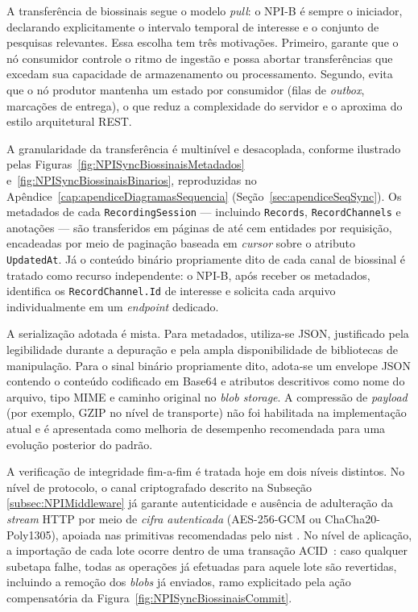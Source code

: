 A transferência de biossinais segue o modelo \textit{pull}: o NPI-B é sempre o iniciador, declarando explicitamente o intervalo temporal de interesse e o conjunto de pesquisas relevantes. Essa escolha tem três motivações. Primeiro, garante que o nó consumidor controle o ritmo de ingestão e possa abortar transferências que excedam sua capacidade de armazenamento ou processamento. Segundo, evita que o nó produtor mantenha um estado por consumidor (filas de \textit{outbox}, marcações de entrega), o que reduz a complexidade do servidor e o aproxima do estilo arquitetural REST.

A granularidade da transferência é multinível e desacoplada, conforme ilustrado pelas Figuras~\ref{fig:NPISyncBiossinaisMetadados} e~\ref{fig:NPISyncBiossinaisBinarios}, reproduzidas no Apêndice~\ref{cap:apendiceDiagramasSequencia} (Seção~\ref{sec:apendiceSeqSync}). Os metadados de cada \texttt{RecordingSession} --- incluindo \texttt{Records}, \texttt{RecordChannels} e anotações --- são transferidos em páginas de até cem entidades por requisição, encadeadas por meio de paginação baseada em \textit{cursor} sobre o atributo \texttt{UpdatedAt}. Já o conteúdo binário propriamente dito de cada canal de biossinal é tratado como recurso independente: o NPI-B, após receber os metadados, identifica os \texttt{RecordChannel.Id} de interesse e solicita cada arquivo individualmente em um \textit{endpoint} dedicado.

A serialização adotada é mista. Para metadados, utiliza-se JSON, justificado pela legibilidade durante a depuração e pela ampla disponibilidade de bibliotecas de manipulação. Para o sinal binário propriamente dito, adota-se um envelope JSON contendo o conteúdo codificado em Base64 e atributos descritivos como nome do arquivo, tipo MIME e caminho original no \textit{blob storage}. A compressão de \textit{payload} (por exemplo, GZIP no nível de transporte) não foi habilitada na implementação atual e é apresentada como melhoria de desempenho recomendada para uma evolução posterior do padrão.

A verificação de integridade fim-a-fim é tratada hoje em dois níveis distintos. No nível de protocolo, o canal criptografado descrito na Subseção \ref{subsec:NPIMiddleware} já garante autenticidade e ausência de adulteração da \textit{stream} HTTP por meio de \textit{cifra autenticada} (AES-256-GCM ou ChaCha20-Poly1305), apoiada nas primitivas recomendadas pelo \gls{nist} \cite{barker2020nist}. No nível de aplicação, a importação de cada lote ocorre dentro de uma transação ACID~\cite{harder1983principles, weikum2002transactional}: caso qualquer subetapa falhe, todas as operações já efetuadas para aquele lote são revertidas, incluindo a remoção dos \textit{blobs} já enviados, ramo explicitado pela ação compensatória da Figura~\ref{fig:NPISyncBiossinaisCommit}.

